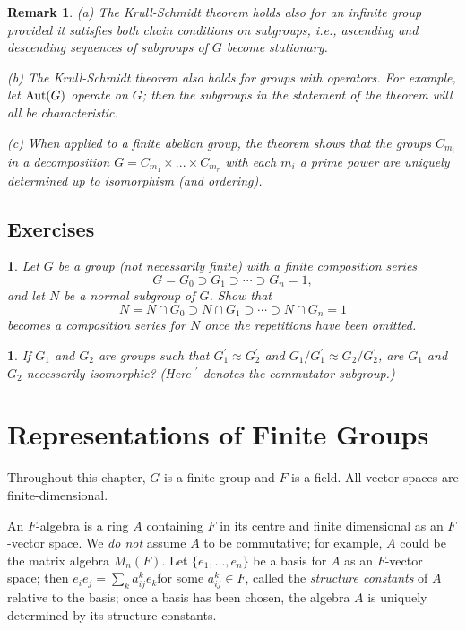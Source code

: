 \documentclass[a4paper,11pt,final]{memoir}%
\newtheorem{remark}[X]{Remark}
\newtheorem{exercise}[Y]{}
\theoremstyle{nonumberplain}
\begin{document}
\begin{remark}
\label{ns31}(a) The Krull-Schmidt theorem holds also for an infinite group
provided it satisfies both chain conditions on subgroups, i.e., ascending and
descending sequences of subgroups of $G$ become stationary.

(b) The Krull-Schmidt theorem also holds for groups with operators. For
example, let $\operatorname{Aut}(G)$ operate on $G$; then the subgroups in the statement of
the theorem will all be characteristic.

(c) When applied to a finite abelian group, the theorem shows that the groups
$C_{m_{i}}$ in a decomposition $G=C_{m_{1}}\times...\times C_{m_{r}}$ with
each $m_{i}$ a prime power are uniquely determined up to isomorphism (and ordering).
\end{remark}

\section{Exercises}

\begin{exercise}
\label{x33a} Let $G$ be a group (not necessarily finite) with a finite
composition series%
\[
G=G_{0}\supset G_{1}\supset\cdots\supset G_{n}=1,
\]
and let $N$ be a normal subgroup of $G$. Show that%
\[
N=N\cap G_{0}\supset N\cap G_{1}\supset\cdots\supset N\cap G_{n}=1
\]
becomes a composition series for $N$ once the repetitions have been omitted.
\end{exercise}

\begin{exercise}
\label{x34}If $G_{1}$ and $G_{2}$ are groups such that $G_{1}^{\prime}\approx
G_{2}^{\prime}$ and $G_{1}/G_{1}^{\prime}\approx G_{2}/G_{2}^{\prime}$, are
$G_{1}$ and $G_{2}$ necessarily isomorphic? (Here $^{\prime}$ denotes the
commutator subgroup.)
\end{exercise}

\clearpage


\chapter{Representations of Finite Groups}

Throughout this chapter, $G$ is a finite group and $F$ is a field. All vector
spaces are finite-dimensional.

An $F$-algebra is a ring $A$ containing $F$ in its centre and finite
dimensional as an $F$-vector space. We \textit{do not} assume $A$ to be
commutative; for example, $A$ could be the matrix algebra $M_{n}(F)$. Let
$\{e_{1},\ldots,e_{n}\}$ be a basis for $A$ as an $F$-vector space; then
$e_{i}e_{j}=\sum\nolimits_{k}a_{ij}^{k}e_{k}$for some $a_{ij}^{k}\in F$,
called the \textit{structure constants} of $A$ relative to the basis; once a
basis has been chosen, the algebra $A$ is uniquely determined by its structure constants.
\end{document}

